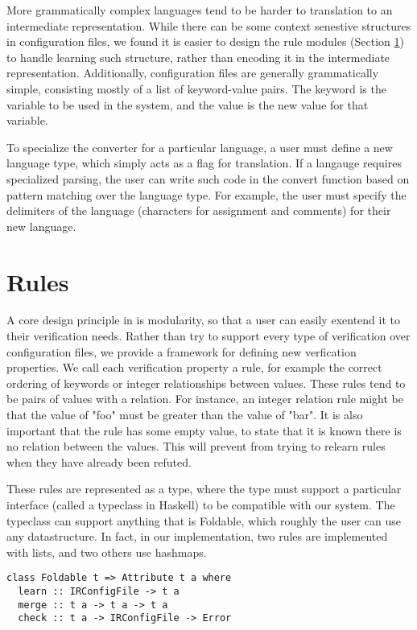 More grammatically complex languages tend to be harder to translation to an intermediate representation.
While there can be some context senestive structures in configuration files, we found it is easier to design the rule modules (Section \ref{}) to handle learning such structure, rather than encoding it in the intermediate representation.
Additionally, configuration files are generally grammatically simple, consisting mostly of a list of keyword-value pairs.
The keyword is the variable to be used in the system, and the value is the new value for that variable.

To specialize the converter for a particular language, a user must define a new language type, which simply acts as a flag for translation.
If a langauge requires specialized parsing, the user can write such code in the convert function based on pattern matching over the language type.
For example, the user must specify the delimiters of the language (characters for assignment and comments) for their new language. 

\section{Rules}

A core design principle in \app is modularity, so that a user can easily exentend it to their verification needs.
Rather than try to support every type of verification over configuration files, we provide a framework for defining new verfication properties.
We call each verification property a rule, for example the correct ordering of keywords or integer relationships between values.
These rules tend to be pairs of values with a relation.
For instance, an integer relation rule might be that the value of "foo" must be greater than the value of "bar".
It is also important that the rule has some empty value, to state that it is known there is no relation between the values.
This will prevent \app from trying to relearn rules when they have already been refuted.

These rules are represented as a type, where the type must support a particular interface (called a typeclass in Haskell) to be compatible with our system.
The typeclass can support anything that is Foldable, which roughly the user can use any datastructure.
In fact, in our implementation, two rules are implemented with lists, and two others use hashmaps.

\begin{lstlisting}
class Foldable t => Attribute t a where
  learn :: IRConfigFile -> t a
  merge :: t a -> t a -> t a
  check :: t a -> IRConfigFile -> Error
\end{lstlisting} 

